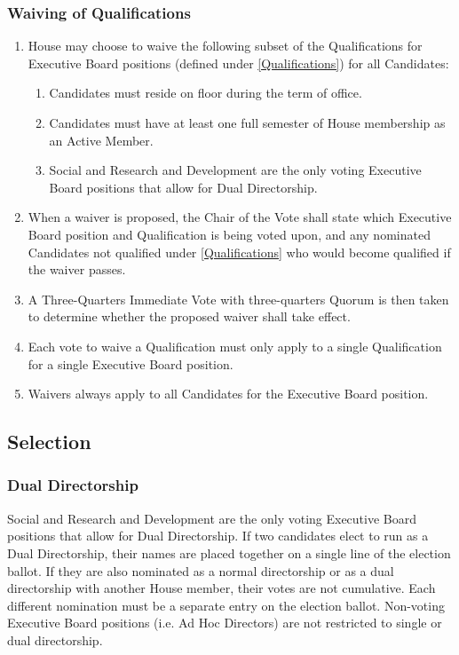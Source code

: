 \documentclass{article}
\newcommand{\asection}[1]{\subsection{#1} \label{#1}}
\newcommand{\asubsection}[1]{\subsubsection{#1} \label{#1}}
\begin{document}
\asubsection{Waiving of Qualifications}
\begin{enumerate}
  \item House may choose to waive the following subset of the Qualifications for Executive Board positions (defined under \ref{Qualifications}) for all Candidates:
    \begin{enumerate}
      \item Candidates must reside on floor during the term of office.
      \item Candidates must have at least one full semester of House membership as an Active Member.
      \item Social and Research and Development are the only voting Executive Board positions that allow for Dual Directorship.
    \end{enumerate}
  \item When a waiver is proposed, the Chair of the Vote shall state which Executive Board position and Qualification is being voted upon, and any nominated Candidates not qualified under \ref{Qualifications} who would become qualified if the waiver passes.
  \item A Three-Quarters Immediate Vote with three-quarters Quorum is then taken to determine whether the proposed waiver shall take effect.
  \item Each vote to waive a Qualification must only apply to a single Qualification for a single Executive Board position.
  \item Waivers always apply to all Candidates for the Executive Board position.
\end{enumerate}

\asection{Selection}
\asubsection{Dual Directorship}
Social and Research and Development are the only voting Executive Board positions that allow for Dual Directorship.
If two candidates elect to run as a Dual Directorship, their names are placed together on a single line of the election ballot.
If they are also nominated as a normal directorship or as a dual directorship with another House member, their votes are not cumulative.
Each different nomination must be a separate entry on the election ballot.
Non-voting Executive Board positions (i.e. Ad Hoc Directors) are not restricted to single or dual directorship.
\end{document}
